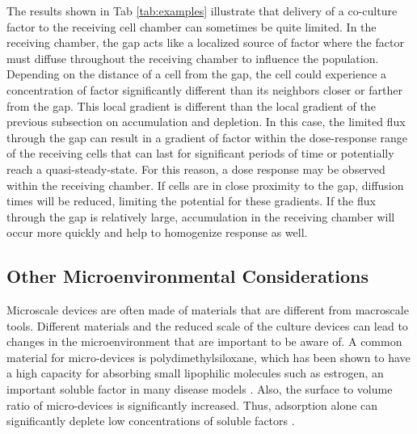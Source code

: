 The results shown in Tab \ref{tab:examples} illustrate that delivery of a co-culture factor to the receiving cell chamber can sometimes be quite limited. In the receiving chamber, the gap acts like a localized source of factor where the factor must diffuse throughout the receiving chamber to influence the population. Depending on the distance of a cell from the gap, the cell could experience a concentration of factor significantly different than its neighbors closer or farther from the gap. This local gradient is different than the local gradient of the previous subsection on accumulation and depletion. In this case, the limited flux through the gap can result in a gradient of factor within the dose-response range of the receiving cells that can last for significant periods of time or potentially reach a quasi-steady-state. For this reason, a dose response may be observed within the receiving chamber. If cells are in close proximity to the gap, diffusion times will be reduced, limiting the potential for these gradients. If the flux through the gap is relatively large, accumulation in the receiving chamber will occur more quickly and help to homogenize response as well.

\subsection{Other Microenvironmental Considerations}
Microscale devices are often made of materials that are different from macroscale tools. Different materials and the reduced scale of the culture devices can lead to changes in the microenvironment that are important to be aware of. A common material for micro-devices is polydimethylsiloxane, which has been shown to have a high capacity for absorbing small lipophilic molecules such as estrogen, an important soluble factor in many disease models \cite{Regehr:2009fk}. Also, the surface to volume ratio of micro-devices is significantly increased. Thus, adsorption alone can significantly deplete low concentrations of soluble factors \cite{Lionello:2005zh}.

